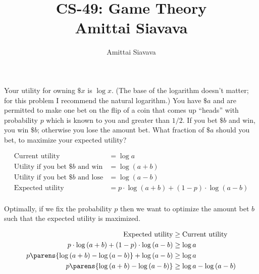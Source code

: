 \documentclass[13pt, reqno]{amsart}
\begin{document}

\title{CS-49: Game Theory\\ Amittai Siavava \\ }
\author{Amittai Siavava}


\setlength{\headheight}{13.0pt}
\setlength{\footskip}{15.0pt}

\maketitle

\begin{problem}[3]
  Your utility for owning $\$x$ is $\log{x}$.
  (The base of the logarithm doesn't matter; for this problem I recommend the natural logarithm.)
  You have $\$a$ and are permitted to make one bet on the flip of a coin that comes up ``heads''
  with probability $p$ which is known to you and greater than $1/2$.
  If you bet $\$b$ and win, you win $\$b$; otherwise you lose the amount bet.
  What fraction of $\$a$ should you bet, to maximize your expected utility?
  
  \begin{align*}
    \text{Current utility} &= \log{a} \\
    \text{Utility if you bet $\$b$ and win} &= \log{(a + b)} \\
    \text{Utility if you bet $\$b$ and lose} &= \log{(a - b)} \\
    \text{Expected utility} &= p \cdot \log{(a + b)} + (1 - p) \cdot \log{(a - b)} \\
  \end{align*}

  Optimally, if we fix the probability $p$ then we want to optimize the amount bet $b$
  such that the expected utility is maximized.

  \begin{align*}
    \text{Expected utility} &\geq \text{Current utility} \\
    p \cdot \log{(a + b)} + (1 - p) \cdot \log{(a - b)} &\geq \log{a} \\
    p \parens{ \log{(a + b)} - \log{(a - b)}} + \log{(a - b)} &\geq \log{a} \\
    p \parens{ \log{(a + b)} - \log{(a - b)}} &\geq \log{a} - \log{(a - b)}\\
  \end{align*}
\end{problem}
\end{document}
